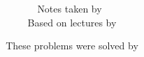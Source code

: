 \newcommand{\Prob}{\mathbf{P}}
\renewcommand{\vec}[1]{\boldsymbol{\mathbf{#1}}}
\DeclareMathOperator{\Bin}{Bin}
\DeclareMathOperator{\Geo}{Geo}
\DeclareMathOperator{\Poi}{Poi}
\DeclareMathOperator{\Exp}{Exp}
\DeclareMathOperator{\Var}{Var} %
\DeclareMathOperator{\Cov}{Cov}

\newcommand{\N}{\mathbb{N}}
\newcommand{\Z}{\mathbb{Z}}
\newcommand{\Q}{\mathbb{Q}}
\newcommand{\R}{\mathbb{R}}
\newcommand{\C}{\mathbb{C}}
\newcommand{\F}{\mathbb{F}}
\newcommand{\E}{\mathbf{E}}
\newcommand{\D}{\mathbb{D}}
\renewcommand{\H}{\mathbb{H}}
\newcommand{\ps}{\mathcal{P}}
\newcommand{\M}{\mathcal{M}}
\renewcommand{\L}{\mathcal{L}}
\renewcommand{\O}{\mathcal{O}}
\renewcommand{\U}{\mathcal{U}}
\newcommand{\Omicron}{O}
\newcommand{\powerset}{\mathcal{P}}

\newcommand{\st}{\text{ s.t. }}
\newcommand{\tand}{\quad \text{and} \quad}
\newcommand{\tor}{\quad \text{or} \quad}
\newcommand{\stand}{\text{ and }}
\newcommand{\stor}{\text{ or }}
\renewcommand{\tt}[1]{\textnormal{\textbf{(#1).}}} %

\title{\textbf{\ncourse}}

\ifx \ntype \notes
  \author{Notes taken by \nauthor\, \nemail \\ Based on lectures by \nlecturer}
  \date{\nterm\ \nyear}
\else
  \ifx \ntype \problems
    \author{These problems were solved by \nauthor \\ \nemail}
  \else
  \fi
\fi

\makeatother
